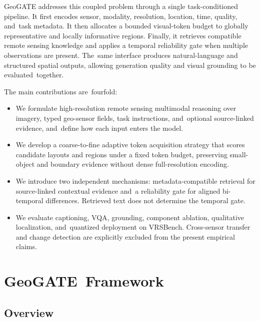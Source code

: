\documentclass[applsci,article,accept,moreauthors]{Definitions/mdpi}
\begin{document}
GeoGATE addresses this coupled problem through a single task-conditioned pipeline. It first encodes sensor, modality, resolution, location, time, quality, and~task metadata. It then allocates a bounded visual-token budget to globally representative and locally informative regions. Finally, it retrieves compatible remote sensing knowledge and applies a temporal reliability gate when multiple observations are present. The~same interface produces natural-language and structured spatial outputs, allowing generation quality and visual grounding to be evaluated~together.

The main contributions are~fourfold:

\begin{itemize}
\item We formulate high-resolution remote sensing multimodal reasoning over imagery, typed geo-sensor fields, task instructions, and~optional source-linked evidence, and~define how each input enters the model.

\item We develop a coarse-to-fine adaptive token acquisition strategy that scores candidate layouts and regions under a fixed token budget, preserving small-object and boundary evidence without dense full-resolution encoding.

\item We introduce two independent mechanisms: metadata-compatible retrieval for source-linked contextual evidence and~a reliability gate for aligned bi-temporal differences. Retrieved text does not determine the temporal gate.

\item We evaluate captioning, VQA, grounding, component ablation, qualitative localization, and~quantized deployment on VRSBench. Cross-sensor transfer and change detection are explicitly excluded from the present empirical claims.
\end{itemize}

\section{GeoGATE~Framework}


\subsection{Overview}
\end{document}

